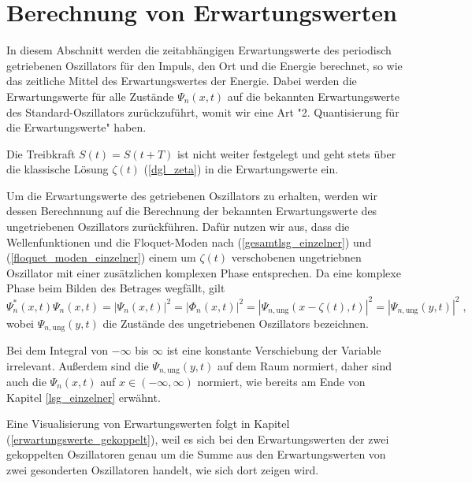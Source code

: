 

\chapter{Berechnung von Erwartungswerten}
\label{3}
  In diesem Abschnitt werden die zeitabhängigen Erwartungswerte des periodisch getriebenen Oszillators für den Impuls, den Ort und die Energie berechnet, so wie das zeitliche Mittel des Erwartungswertes der Energie.
  Dabei werden die Erwartungswerte für alle Zustände $\Psi_n(x,t)$ auf die bekannten Erwartungswerte des Standard-Oszillators zurückzuführt, womit wir eine Art "2. Quantisierung für die Erwartungswerte" haben.

  Die Treibkraft $S(t)=S(t+T)$ ist nicht weiter festgelegt und geht stets über die klassische Lösung $\zeta(t)$ (\ref{dgl_zeta}) in die Erwartungswerte ein.

  Um die Erwartungswerte des getriebenen Oszillators zu erhalten, werden wir dessen Berechnnung auf die Berechnung der bekannten Erwartungswerte des ungetriebenen Oszillators zurückführen.
  Dafür nutzen wir aus, dass die Wellenfunktionen und die Floquet-Moden nach (\ref{gesamtlsg_einzelner}) und (\ref{floquet_moden_einzelner}) einem um $\zeta(t)$ verschobenen ungetriebnen Oszillator mit einer zusätzlichen komplexen Phase entsprechen.
  Da eine komplexe Phase beim Bilden des Betrages wegfällt, gilt
  \begin{equation}
    \Psi_n^*(x,t)\Psi_n(x,t) = |\Psi_n(x,t)|^2 = |\Phi_n(x,t)|^2 = |\Psi_{n,\text{ung}}(x-\zeta(t),t)|^2 = |\Psi_{n,\text{ung}}(y,t)|^2 \; ,
    \label{betrag_einzelner}
  \end{equation}
  wobei $\Psi_{n,\text{ung}}(y,t)$ die Zustände des ungetriebenen Oszillators bezeichnen.

  Bei dem Integral von $-\infty$ bis $\infty$ ist eine konstante Verschiebung der Variable irrelevant.
  Außerdem sind die $\Psi_{n,\text{ung}}(y,t)$ auf dem Raum normiert, daher sind auch die $\Psi_n(x,t)$ auf $x \in (-\infty,\infty)$ normiert, wie bereits am Ende von Kapitel \ref{lsg_einzelner} erwähnt.

  Eine Visualisierung von Erwartungswerten folgt in Kapitel (\ref{erwartungswerte_gekoppelt}), weil es sich bei den Erwartungswerten der zwei gekoppelten Oszillatoren genau um die Summe aus den Erwartungswerten von zwei gesonderten Oszillatoren handelt, wie sich dort zeigen wird.

